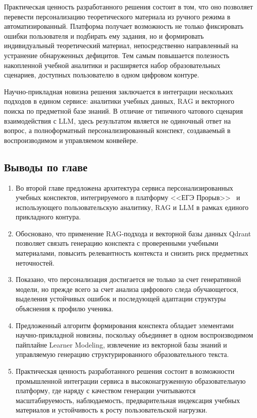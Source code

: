 \documentclass[a4paper,12pt]{extarticle}
\begin{document}
Практическая ценность разработанного решения состоит в том, что оно позволяет перевести 
персонализацию теоретического материала из ручного режима в автоматизированный. Платформа 
получает возможность не только фиксировать ошибки пользователя и подбирать ему задания, 
но и формировать индивидуальный теоретический материал, непосредственно направленный на 
устранение обнаруженных дефицитов. Тем самым повышается полезность накопленной учебной 
аналитики и расширяется набор образовательных сценариев, доступных пользователю в одном 
цифровом контуре.

Научно-прикладная новизна решения заключается в интеграции нескольких подходов в едином 
сервисе: аналитики учебных данных, RAG и векторного поиска по 
предметной базе знаний. В отличие от типичного чатового сценария взаимодействия с LLM, 
здесь результатом является не одиночный ответ на вопрос, а полноформатный персонализированный 
конспект, создаваемый в воспроизводимом и управляемом конвейере.

\subsection{Выводы по главе}

\begin{enumerate}
    \item Во второй главе предложена архитектура сервиса персонализированных учебных 
	конспектов, интегрируемого в платформу <<ЕГЭ Прорыв>>~\cite{exambreakout2026} и использующего 
	пользовательскую аналитику, RAG и LLM в рамках единого прикладного контура.
    \item Обосновано, что применение RAG-подхода и векторной базы данных Qdrant позволяет 
	связать генерацию конспекта с проверенными учебными материалами, повысить релевантность 
	контекста и снизить риск предметных неточностей.
    \item Показано, что персонализация достигается не только за счет генеративной модели, 
	но прежде всего за счет анализа цифрового следа обучающегося, выделения устойчивых ошибок 
	и последующей адаптации структуры объяснения к профилю ученика.
    \item Предложенный алгоритм формирования конспекта обладает элементами научно-прикладной 
	новизны, поскольку объединяет в одном воспроизводимом пайплайне Learner Modeling, 
	извлечение из векторной базы знаний и управляемую генерацию структурированного 
	образовательного текста.
    \item Практическая ценность разработанного решения состоит в возможности промышленной 
	интеграции сервиса в высоконагруженную образовательную платформу, где наряду с качеством 
	генерации учитываются масштабируемость, наблюдаемость, предварительная индексация
	учебных материалов и устойчивость к росту пользовательской нагрузки.
\end{enumerate}
\pagebreak
\end{document}
